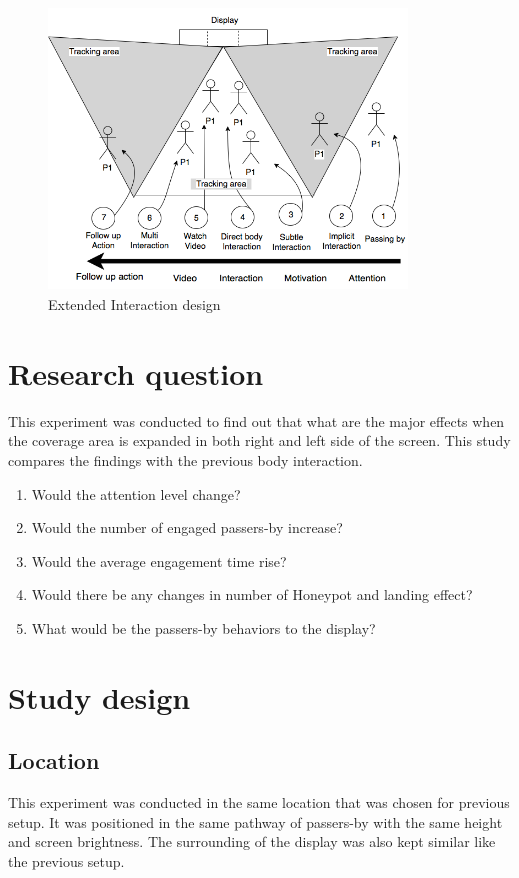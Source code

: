 \begin{figure}[H]
    \centering
    \includegraphics[width=0.85\textwidth,height=7.5cm]{Figures/9/enhanced_interaction_design}
    \caption{Extended Interaction design}%
    \label{fig:KinectExtended}%
\end{figure}




\section{Research question}
This experiment was conducted to find out that what are the major effects when the coverage area is expanded in both right and left side of the screen. This study compares the findings with the previous body interaction.

\begin{enumerate}
\item Would the attention level change?
\item Would the number of engaged passers-by increase?
\item Would the average engagement time rise?
\item Would there be any changes in number of Honeypot and landing effect?
\item What would be the passers-by behaviors to the display?
\end{enumerate}




\section{Study design}

\subsection{Location}
This experiment was conducted in the same location that was chosen for previous setup. It was positioned in the same pathway of passers-by with the same height and screen brightness.  The surrounding of the display was also kept similar like the previous setup.

